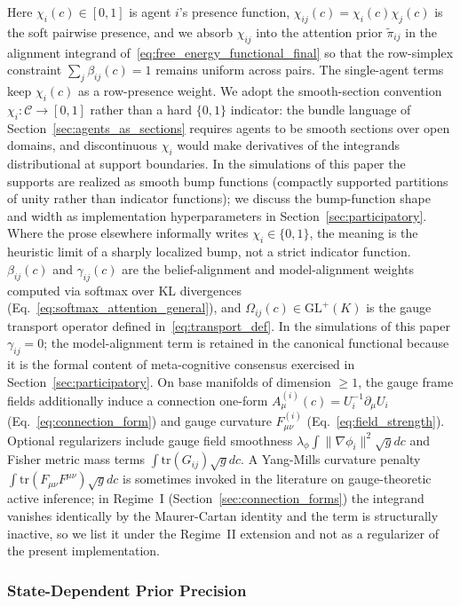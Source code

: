 \documentclass[11pt]{article}
\begin{document}
Here $\chi_i(c) \in [0, 1]$ is agent $i$'s presence function, $\chi_{ij}(c) = \chi_i(c) \chi_j(c)$ is the soft pairwise presence, and we absorb $\chi_{ij}$ into the attention prior $\tilde{\pi}_{ij}$ in the alignment integrand of~\eqref{eq:free_energy_functional_final} so that the row-simplex constraint $\sum_j \beta_{ij}(c) = 1$ remains uniform across pairs. The single-agent terms keep $\chi_i(c)$ as a row-presence weight. We adopt the smooth-section convention $\chi_i: \mathcal{C} \to [0, 1]$ rather than a hard $\{0, 1\}$ indicator: the bundle language of Section~\ref{sec:agents_as_sections} requires agents to be smooth sections over open domains, and discontinuous $\chi_i$ would make derivatives of the integrands distributional at support boundaries. In the simulations of this paper the supports are realized as smooth bump functions (compactly supported partitions of unity rather than indicator functions); we discuss the bump-function shape and width as implementation hyperparameters in Section~\ref{sec:participatory}. Where the prose elsewhere informally writes $\chi_i \in \{0, 1\}$, the meaning is the heuristic limit of a sharply localized bump, not a strict indicator function. $\beta_{ij}(c)$ and $\gamma_{ij}(c)$ are the belief-alignment and model-alignment weights computed via softmax over KL divergences (Eq.~\ref{eq:softmax_attention_general}), and $\Omega_{ij}(c) \in \mathrm{GL}^+(K)$ is the gauge transport operator defined in~\eqref{eq:transport_def}. In the simulations of this paper $\gamma_{ij} = 0$; the model-alignment term is retained in the canonical functional because it is the formal content of meta-cognitive consensus exercised in Section~\ref{sec:participatory}. On base manifolds of dimension $\geq 1$, the gauge frame fields additionally induce a connection one-form $A_\mu^{(i)}(c) = U_i^{-1}\partial_\mu U_i$ (Eq.~\ref{eq:connection_form}) and gauge curvature $F_{\mu\nu}^{(i)}$ (Eq.~\ref{eq:field_strength}). Optional regularizers include gauge field smoothness $\lambda_\phi \int \|\nabla \phi_i\|^2  \sqrt{g} dc$ and Fisher metric mass terms $\int \mathrm{tr}(G_{ij})  \sqrt{g} dc$. A Yang-Mills curvature penalty $\int \mathrm{tr}(F_{\mu\nu} F^{\mu\nu})  \sqrt{g} dc$ is sometimes invoked in the literature on gauge-theoretic active inference; in Regime~I (Section~\ref{sec:connection_forms}) the integrand vanishes identically by the Maurer-Cartan identity and the term is structurally inactive, so we list it under the Regime~II extension and not as a regularizer of the present implementation.

\subsubsection{State-Dependent Prior Precision}
\label{sec:state_dependent_precision}
\end{document}
